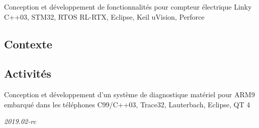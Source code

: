\documentclass[10pt, a4paper, sans]{moderncv}
\begin{document}
	{Conception et développement de fonctionnalités pour compteur électrique Linky}
	{C++03, STM32, RTOS RL-RTX, Eclipse, Keil uVision, Perforce}
\subsection{Contexte}
\cvline{}{
\begin{itemize}
  \item 
\end{itemize}}
\subsection{Activités}
\cvline{}{
\begin{itemize}
  \item 
\end{itemize}}

	{Conception et développement d’un système de diagnostique matériel pour ARM9 embarqué dans les téléphones}
	{C99/C++03, Trace32, Lauterbach, Eclipse, QT 4}

\emptysection{}\closesection
\vfill
\begin{center}
\textit{\small 2019.02-rc}
\end{center}
\end{document}
